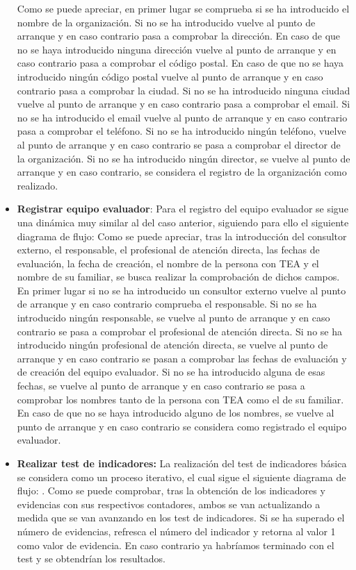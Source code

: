 \begin{itemize}
    Como se puede apreciar, en primer lugar se comprueba si se ha introducido el
    nombre de la organización. Si no se ha introducido vuelve al punto de
    arranque y en caso contrario pasa a comprobar la dirección. En caso de que
    no se haya introducido ninguna dirección vuelve al punto de arranque y en
    caso contrario pasa a comprobar el código postal. En caso de que no se haya
    introducido ningún código postal vuelve al punto de arranque y en caso
    contrario pasa a comprobar la ciudad. Si no se ha introducido ninguna ciudad
    vuelve al punto de arranque y en caso contrario pasa a comprobar el email.
    Si no se ha introducido el email vuelve al punto de arranque y en caso
    contrario pasa a comprobar el teléfono. Si no se ha introducido ningún
    teléfono, vuelve al punto de arranque y en caso contrario se pasa a
    comprobar el director de la organización. Si no se ha introducido ningún
    director, se vuelve al punto de arranque y en caso contrario, se considera
    el registro de la organización como realizado.
    \item \textbf{Registrar equipo evaluador}: Para el registro del equipo evaluador se sigue una dinámica muy similar al del caso anterior, siguiendo para ello el siguiente diagrama de flujo:
    Como se puede apreciar, tras la introducción del consultor externo, el
    responsable, el profesional de atención directa, las fechas de evaluación,
    la fecha de creación, el nombre de la persona con TEA y el nombre de su
    familiar, se busca realizar la comprobación de dichos campos. En primer
    lugar si no se ha introducido un consultor externo vuelve al punto de
    arranque y en caso contrario comprueba el responsable. Si no se ha
    introducido ningún responsable, se vuelve al punto de arranque y en caso
    contrario se pasa a comprobar el profesional de atención directa. Si no se
    ha introducido ningún profesional de atención directa, se vuelve al punto de
    arranque y en caso contrario se pasan a comprobar las fechas de evaluación y
    de creación del equipo evaluador. Si no se ha introducido alguna de esas
    fechas, se vuelve al punto de arranque y en caso contrario se pasa a
    comprobar los nombres tanto de la persona con TEA como el de su familiar. En
    caso de que no se haya introducido alguno de los nombres, se vuelve al punto
    de arranque y en caso contrario se considera como registrado el equipo
    evaluador.
    \item \textbf{Realizar test de indicadores: }La realización del test de indicadores básica se considera como un proceso iterativo, el cual sigue el siguiente diagrama de flujo:
    .
    Como se puede comprobar, tras la obtención de los indicadores y evidencias con sus respectivos contadores, ambos se van actualizando a medida que se van avanzando en los test de indicadores. Si se ha superado el número de evidencias, refresca el número del indicador y retorna al valor 1 como valor de evidencia. En caso contrario ya habríamos terminado con el test y se obtendrían los resultados.


\end{itemize}
